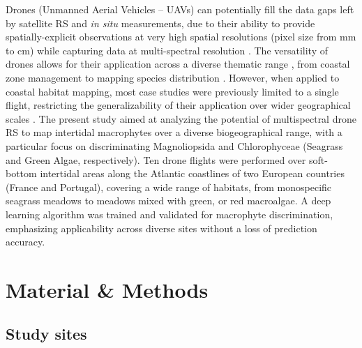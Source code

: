 \documentclass[
  number]{elsarticle}
\begin{document}
Drones (Unmanned Aerial Vehicles -- UAVs) can potentially fill the data
gaps left by satellite RS and \emph{in situ} measurements, due to their
ability to provide spatially-explicit observations at very high spatial
resolutions (pixel size from mm to cm) while capturing data at
multi-spectral resolution \citetext{\citealp[
]{fairley2022drone}; \citealp{oh2017use}}. The versatility of drones
allows for their application across a diverse thematic range , from
coastal zone management \citetext{\citealp[ ]{adade2021}; \citealp[
]{casella2020}; \citealp{angnuureng2022}} to mapping species
distribution \citetext{\citealp[ ]{joyce2023}; \citealp[
]{tallam2023}; \citealp[ ]{Roca2022}; \citealp[ ]{Roman2021}; \citealp[
]{Brunier2022Topographic}; \citealp{sousa2019blue}}. However, when
applied to coastal habitat mapping, most case studies were previously
limited to a single flight, restricting the generalizability of their
application over wider geographical scales \citetext{\citealp[
]{Roman2021}; \citealp[ ]{collin2019improving}; \citealp[
]{rossiter2020uav}; \citealp{Brunier2022Topographic}}. The present study
aimed at analyzing the potential of multispectral drone RS to map
intertidal macrophytes over a diverse biogeographical range, with a
particular focus on discriminating Magnoliopsida and Chlorophyceae
(Seagrass and Green Algae, respectively). Ten drone flights were
performed over soft-bottom intertidal areas along the Atlantic
coastlines of two European countries (France and Portugal), covering a
wide range of habitats, from monospecific seagrass meadows to meadows
mixed with green, or red macroalgae. A deep learning algorithm was
trained and validated for macrophyte discrimination, emphasizing
applicability across diverse sites without a loss of prediction
accuracy.

\section{Material \& Methods}\label{material-methods}

\subsection{Study sites}\label{study-sites}
\end{document}
